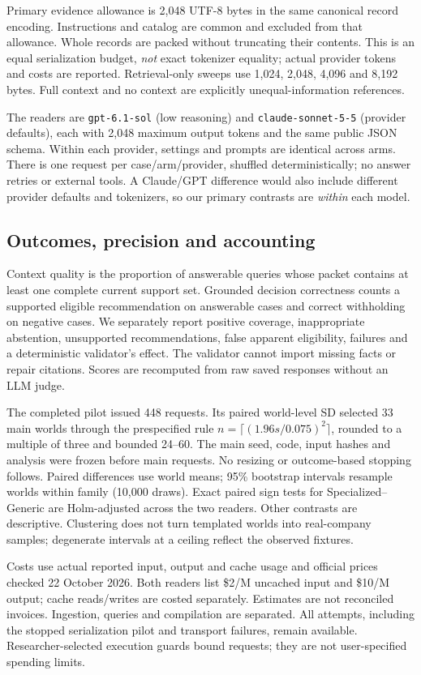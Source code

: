 Primary evidence allowance is 2,048 UTF-8 bytes in the same canonical record encoding. Instructions and catalog are common and excluded from that allowance. Whole records are packed without truncating their contents. This is an equal serialization budget, \emph{not} exact tokenizer equality; actual provider tokens and costs are reported. Retrieval-only sweeps use 1,024, 2,048, 4,096 and 8,192 bytes. Full context and no context are explicitly unequal-information references.

The readers are \texttt{gpt-6.1-sol} (low reasoning) and \texttt{claude-sonnet-5-5} (provider defaults), each with 2,048 maximum output tokens and the same public JSON schema. Within each provider, settings and prompts are identical across arms. There is one request per case/arm/provider, shuffled deterministically; no answer retries or external tools. A Claude/GPT difference would also include different provider defaults and tokenizers, so our primary contrasts are \emph{within} each model.

\subsection{Outcomes, precision and accounting}
Context quality is the proportion of answerable queries whose packet contains at least one complete current support set. Grounded decision correctness counts a supported eligible recommendation on answerable cases and correct withholding on negative cases. We separately report positive coverage, inappropriate abstention, unsupported recommendations, false apparent eligibility, failures and a deterministic validator's effect. The validator cannot import missing facts or repair citations. Scores are recomputed from raw saved responses without an LLM judge.

The completed pilot issued 448 requests. Its paired world-level SD selected 33 main worlds through the prespecified rule $n=\lceil(1.96s/0.075)^2\rceil$, rounded to a multiple of three and bounded 24--60. The main seed, code, input hashes and analysis were frozen before main requests. No resizing or outcome-based stopping follows. Paired differences use world means; 95\% bootstrap intervals resample worlds within family (10,000 draws). Exact paired sign tests for Specialized--Generic are Holm-adjusted across the two readers. Other contrasts are descriptive. Clustering does not turn templated worlds into real-company samples; degenerate intervals at a ceiling reflect the observed fixtures.

Costs use actual reported input, output and cache usage and official prices checked 22 October 2026. Both readers list \$2/M uncached input and \$10/M output; cache reads/writes are costed separately. Estimates are not reconciled invoices. Ingestion, queries and compilation are separated. All attempts, including the stopped serialization pilot and transport failures, remain available. Researcher-selected execution guards bound requests; they are not user-specified spending limits.
